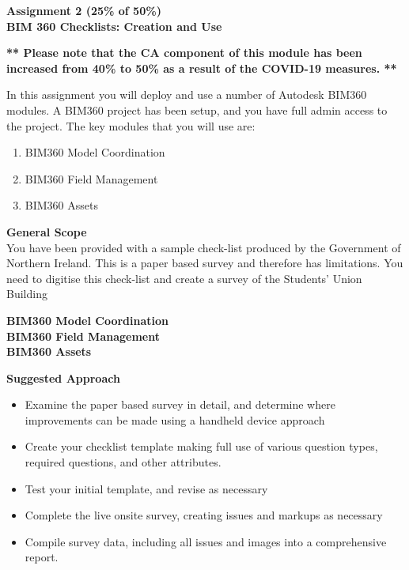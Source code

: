 
	
\begin{flushleft}
\Large\textbf{Assignment 2 (25\% of 50\%)\\
	BIM 360 Checklists: Creation and Use}\\
\end{flushleft}

\textbf{** Please note that the CA component of this module has been increased from 40\% to 50\% as a result of the  COVID-19 measures. **} 

In this assignment you will deploy and use a number of Autodesk BIM360 modules.  A BIM360 project has been setup, and you have full admin access to the project.  The key modules that you will use are:

\begin{enumerate}
	\item BIM360 Model Coordination
	\item BIM360 Field Management
	\item BIM360 Assets 
\end{enumerate}

\textbf{General Scope}\\


You have been provided with a sample check-list produced by the Government of Northern Ireland.  This is a paper based survey and therefore has limitations.  You need to digitise this check-list and create a survey of the Students' Union Building


\textbf{BIM360 Model Coordination}\\



\textbf{BIM360 Field Management}\\



\textbf{BIM360 Assets}\\







\vspace{.5cm}

\textbf{Suggested Approach}

\begin{itemize}
	\item Examine the paper based survey in detail, and determine where improvements can be made using a handheld device approach
	\item Create your checklist template making full use of various question types, required questions, and other attributes.
	\item Test your initial template, and revise as necessary
	\item Complete the live onsite survey, creating issues and markups as necessary
	\item Compile survey data, including all issues and images into a comprehensive report.
\end{itemize}


